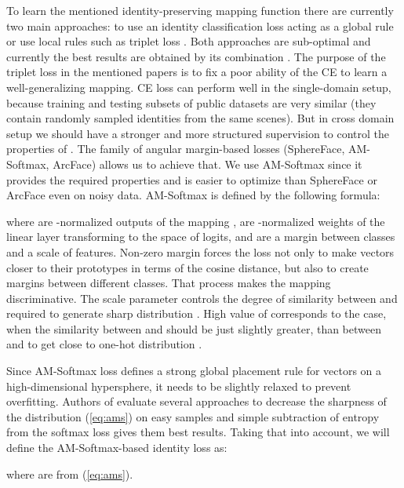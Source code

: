 \documentclass[a4paper,conference]{IEEEtran}
\begin{document}
To learn the mentioned identity-preserving mapping function 
there are currently two main approaches: to use an identity classification loss
\cite{zheng2016person, Xiao2016LearningDF} acting as a global rule or use local rules such as triplet
loss \cite{inDefenceTriplet1, inDefenceTriplet2}. Both approaches are
sub-optimal and currently the best results are obtained by its combination
\cite{mgn, abd, Luo2019BagOT}. The purpose of the triplet loss in the mentioned
papers is to fix a poor ability of the CE to learn a well-generalizing mapping.
CE loss can perform well in the single-domain setup, because training and
testing subsets of public datasets \cite{market, duke2, MSMT17} are very similar
(they contain randomly sampled identities from the same scenes).  But in cross
domain setup we should have a stronger and more structured supervision to
control the properties of . The family of angular margin-based losses
(SphereFace\cite{Liu2017SphereFaceDH}, AM-Softmax\cite{amSoftmax},
ArcFace\cite{deng2018arcface}) allows us to achieve that. We use AM-Softmax
since it provides the required properties and is easier to
optimize than SphereFace or ArcFace even on noisy data.  AM-Softmax is defined
by the following formula:




where  are -normalized outputs of the mapping ,
 are -normalized weights of the linear layer
transforming  to the space of logits,  and  are a margin between
classes and a scale of features.  Non-zero margin forces the loss not only to
make vectors  closer to their prototypes  in terms of the cosine
distance, but also to create margins between different classes. That process
makes the mapping  discriminative. The scale parameter  controls the degree of similarity
between  and  required to generate sharp distribution .
High value of  corresponds to the case, when the similarity between  and 
should be just slightly greater, than between  and  to get close to one-hot distribution .

Since AM-Softmax loss defines a strong global placement rule for vectors  on
a high-dimensional hypersphere, it needs to be slightly relaxed to prevent
overfitting. Authors of \cite{Adaimi2019RethinkingPR} evaluate several
approaches to decrease the sharpness of the distribution  (\ref{eq:ams}) on easy samples
and simple subtraction of entropy from the softmax loss gives them best
results. Taking that into account, we will define the AM-Softmax-based identity
loss as:


where  are from (\ref{eq:ams}).
\end{document}
